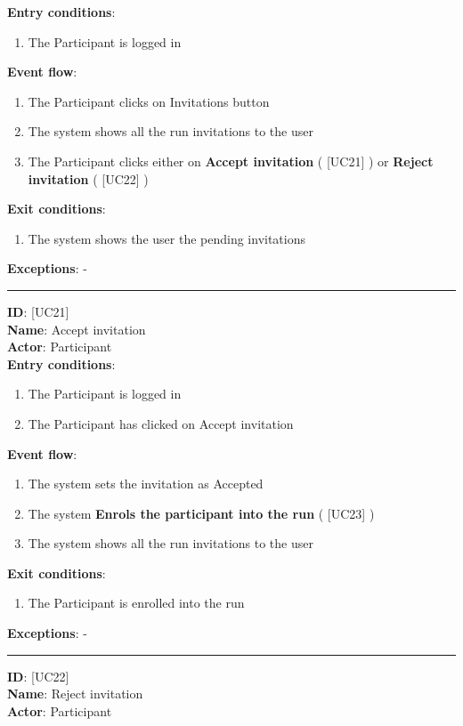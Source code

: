 \documentclass[hidelinks, 12pt]{report}
\newcommand\usecase[1]{ [UC#1] }
\begin{document}
\begin{itemize}
		\textbf{Entry conditions}:
		\begin{enumerate}
			\item{The Participant is logged in}
		\end{enumerate}
		\textbf{Event flow}:
		\begin{enumerate}
			\item{The Participant clicks on Invitations button}
			\item{The system shows all the run invitations to the user}
			\item{The Participant clicks either on \textbf{Accept invitation} (\usecase{21}) or \textbf{Reject invitation} (\usecase{22})}
		\end{enumerate}
		\textbf{Exit conditions}:
		\begin{enumerate}
			\item{The system shows the user the pending invitations}
		\end{enumerate}
		\textbf{Exceptions}: - \\
		\rule{\linewidth}{0.4pt}
		\textbf{ID}: \usecase{21} \\
		\textbf{Name}: Accept invitation \\
		\textbf{Actor}: Participant \\
		\textbf{Entry conditions}:
		\begin{enumerate}
			\item{The Participant is logged in}
			\item{The Participant has clicked on Accept invitation}
		\end{enumerate}
		\textbf{Event flow}:
		\begin{enumerate}
			\item{The system sets the invitation as Accepted}
			\item{The system \textbf{Enrols the participant into the run} (\usecase{23})}
			\item{The system shows all the run invitations to the user}
		\end{enumerate}
		\textbf{Exit conditions}:
		\begin{enumerate}
			\item{The Participant is enrolled into the run}
		\end{enumerate}
		\textbf{Exceptions}: - \\
		\rule{\linewidth}{0.4pt}
		\textbf{ID}: \usecase{22} \\
		\textbf{Name}: Reject invitation \\
		\textbf{Actor}: Participant \\

\end{itemize}
\end{document}
